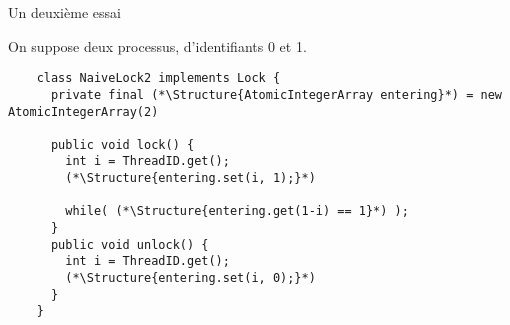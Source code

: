 
\begingroup

\begin{frame}[fragile]{Un deuxième essai}

  \vspace{-15mm}
  On suppose deux processus, d'identifiants 0 et 1. 

  \begin{lstlisting}
    class NaiveLock2 implements Lock {
      private final (*\Structure{AtomicIntegerArray entering}*) = new AtomicIntegerArray(2)

      public void lock() {
        int i = ThreadID.get();
        (*\Structure{entering.set(i, 1);}*) 
        
        while( (*\Structure{entering.get(1-i) == 1}*) );
      }
      public void unlock() {
        int i = ThreadID.get();
        (*\Structure{entering.set(i, 0);}*)
      }
    }
  \end{lstlisting}
  

\end{frame}

\endgroup
\endinput
